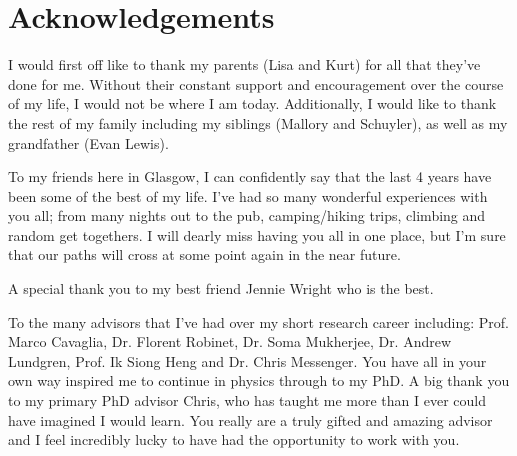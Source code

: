 \chapter{Acknowledgements}

%
%
I would first off like to thank my parents (Lisa and Kurt) for all 
that they've done for me. Without their constant support and encouragement 
over the course of my life, I would not be where I am today. Additionally, I would like to thank 
the rest of my family including my siblings (Mallory and Schuyler), as well as my grandfather (Evan Lewis). 

%
%
To my friends here in Glasgow, I can confidently say that the last 4 years have been some of the best 
of my life. I've had so many wonderful experiences with you all; from many nights out 
to the pub, camping/hiking trips, climbing and random get togethers. I will dearly miss 
having you all in one place, but I'm sure that our paths will cross at some point 
again in the near future. 

%
%
A special thank you to my best friend Jennie Wright who is the best.

%
%
To the many advisors that I've had over my short research career including: 
Prof. Marco Cavaglia, Dr. Florent Robinet, Dr. Soma Mukherjee, 
Dr. Andrew Lundgren, Prof. Ik Siong Heng and Dr. Chris Messenger. You have all
in your own way inspired me to continue in physics through to my PhD. A big 
thank you to my primary PhD advisor Chris, who has taught me more than 
I ever could have imagined I would learn. You really are a truly gifted and amazing 
advisor and I feel incredibly lucky to have had the opportunity to work with you.
